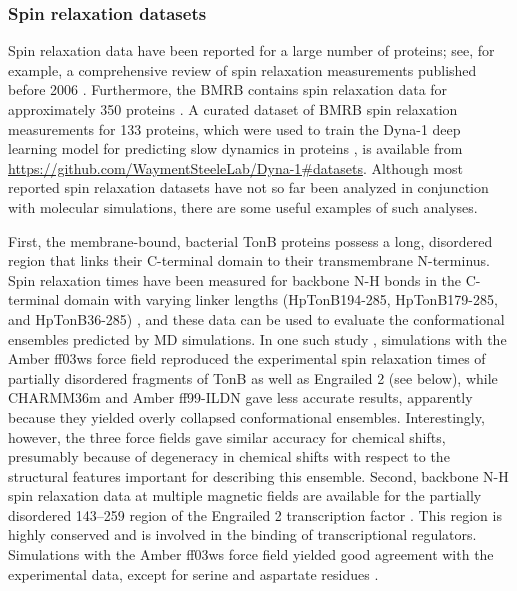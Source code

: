 \documentclass[9pt,review,pubversion]{livecoms}
\begin{document}
\subsubsection{Spin relaxation datasets}
\label{sub2:spin_relax_datasets}

Spin relaxation data have been reported for a large number of proteins; see, for example, a comprehensive review of spin relaxation measurements published before 2006 \cite{jarymowycz_fast_2006}.
Furthermore, the BMRB contains spin relaxation data for approximately 350 proteins
\cite{ulrich_biomagresbank_2008,romero_biomagresbank_2020,hoch_biological_2023}.
A curated dataset of BMRB spin relaxation measurements for 133 proteins, which were used to train the Dyna-1 deep learning model for predicting slow dynamics in proteins \cite{wayment-steele_learning_2025}, is available from \url{https://github.com/WaymentSteeleLab/Dyna-1#datasets}.
Although most reported spin relaxation datasets have not so far been analyzed in conjunction with molecular simulations, there are some useful examples of such analyses.

First, the membrane-bound, bacterial TonB proteins possess a long, disordered region that links their C-terminal domain to their transmembrane N-terminus.
Spin relaxation times have been measured for backbone N-H bonds in the C-terminal domain with varying linker lengths (HpTonB194-285, HpTonB179-285, and HpTonB36-285) \cite{ciragan_nmr_2020}, and these data can be used to evaluate the conformational ensembles predicted by MD simulations.
In one such study \cite{virtanen_heterogeneous_2020}, simulations with the Amber ff03ws force field reproduced the experimental spin relaxation times of partially disordered fragments of TonB as well as Engrailed 2 (see below), while CHARMM36m and Amber ff99-ILDN gave less accurate results, apparently because they yielded overly collapsed conformational ensembles.
Interestingly, however, the three force fields gave similar accuracy for chemical shifts, presumably because of degeneracy in chemical shifts with respect to the structural features important for describing this ensemble.
Second, backbone N-H spin relaxation data at multiple magnetic fields are available for the partially disordered 143–259 region of the Engrailed 2 transcription factor \cite{khan_distribution_2015}.
This region is highly conserved and is involved in the binding of transcriptional regulators.
Simulations with the Amber ff03ws force field yielded good agreement with the experimental data, except for serine and aspartate residues \cite{virtanen_heterogeneous_2020}.
\end{document}

